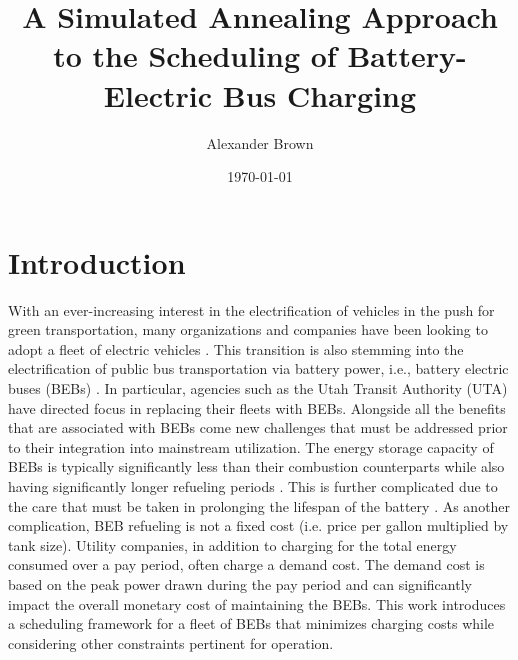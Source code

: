 \documentclass[energies,article,submit,moreauthors]{Definitions/mdpi}
\author{Alexander Brown}
\date{\today}
\title{A Simulated Annealing Approach to the Scheduling of Battery-Electric Bus Charging}
\begin{document}
\maketitle
\tableofcontents

\parskip 3mm                                %
\let\ref\autoref                            %

\renewcommand{\chapterautorefname}{Chapter}
\renewcommand{\sectionautorefname}{Section}
\renewcommand{\subsectionautorefname}{Section}
\renewcommand{\subsubsectionautorefname}{Section}
\renewcommand{\paragraphautorefname}{Section}
\renewcommand{\algorithmautorefname}{Algorithm}

\section{Introduction}
\label{sec:sa-introduction}
With an ever-increasing interest in the electrification of vehicles in the push for green transportation, many
organizations and companies have been looking to adopt a fleet of electric vehicles \cite{khan-2022-inves}. This
transition is also stemming into the electrification of public bus transportation via battery power, i.e., battery
electric buses (BEBs) \cite{li-2016-batter-elect,guida-2017-zeeus-repor-europ}. In particular, agencies such as the
Utah Transit Authority (UTA) have directed focus in replacing their fleets with BEBs. Alongside all the benefits that
are associated with BEBs come new challenges that must be addressed prior to their integration into mainstream
utilization. The energy storage capacity of BEBs is typically significantly less than their combustion counterparts
while also having significantly longer refueling periods \cite{xylia-2018-role-charg,li-2016-batter-elect}. This is
further complicated due to the care that must be taken in prolonging the lifespan of the battery
\cite{lutsey-2019-updat-elect,edge-2021-lithium,millner-2010-model-lithium}. As another complication, BEB refueling
is not a fixed cost (i.e. price per gallon multiplied by tank size). Utility companies, in addition to charging for the
total energy consumed over a pay period, often charge a demand cost. The demand cost is based on the peak power drawn
during the pay period and can significantly impact the overall monetary cost of maintaining the BEBs. This work
introduces a scheduling framework for a fleet of BEBs that minimizes charging costs while considering other constraints
pertinent for operation.
\end{document}
